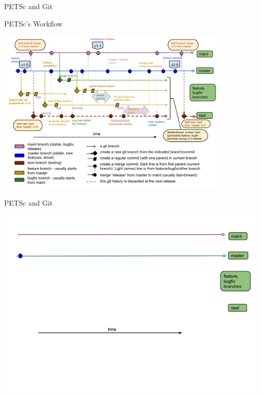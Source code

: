 

\begin{frame}{PETSc and Git}
  \begin{block}{PETSc's Workflow}
  \begin{center}
    \includegraphics[width=0.85\textwidth]{figures/gitworkflows-satish}
  \end{center}
  \end{block}
\end{frame}


\begin{frame}{PETSc and Git}
  \begin{center}
    \includegraphics[width=0.99\textwidth]{figures/gitworkflows-45}
  \end{center}
\end{frame}

